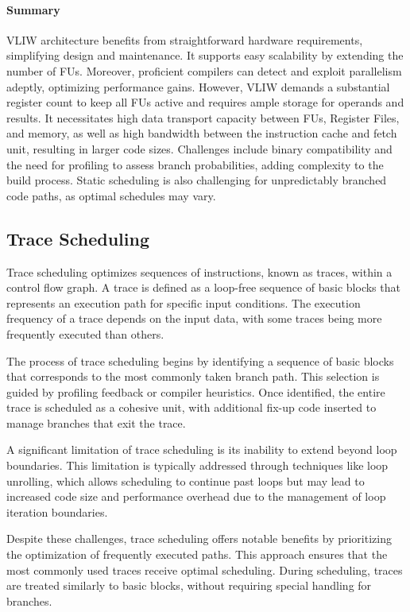 \paragraph*{Summary}
VLIW architecture benefits from straightforward hardware requirements, simplifying design and maintenance. 
It supports easy scalability by extending the number of FUs. Moreover, proficient compilers can detect and exploit parallelism adeptly, optimizing performance gains.
However, VLIW demands a substantial register count to keep all FUs active and requires ample storage for operands and results. 
It necessitates high data transport capacity between FUs, Register Files, and memory, as well as high bandwidth between the instruction cache and fetch unit, resulting in larger code sizes. 
Challenges include binary compatibility and the need for profiling to assess branch probabilities, adding complexity to the build process. 
Static scheduling is also challenging for unpredictably branched code paths, as optimal schedules may vary.

\subsection{Trace Scheduling}
Trace scheduling optimizes sequences of instructions, known as traces, within a control flow graph. 
A trace is defined as a loop-free sequence of basic blocks that represents an execution path for specific input conditions. 
The execution frequency of a trace depends on the input data, with some traces being more frequently executed than others.

The process of trace scheduling begins by identifying a sequence of basic blocks that corresponds to the most commonly taken branch path. 
This selection is guided by profiling feedback or compiler heuristics. 
Once identified, the entire trace is scheduled as a cohesive unit, with additional fix-up code inserted to manage branches that exit the trace.

A significant limitation of trace scheduling is its inability to extend beyond loop boundaries. 
This limitation is typically addressed through techniques like loop unrolling, which allows scheduling to continue past loops but may lead to increased code size and performance overhead due to the management of loop iteration boundaries.

Despite these challenges, trace scheduling offers notable benefits by prioritizing the optimization of frequently executed paths. 
This approach ensures that the most commonly used traces receive optimal scheduling.
 During scheduling, traces are treated similarly to basic blocks, without requiring special handling for branches.

